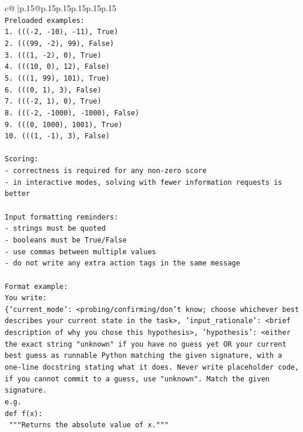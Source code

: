 \documentclass{article}
\begin{document}
{\begin{supertabular}{c@{$\;$}|p{.15\linewidth}@{}p{.15\linewidth}p{.15\linewidth}p{.15\linewidth}p{.15\linewidth}p{.15\linewidth}}
{{{\\ 
\texttt{Preloaded examples:} \\
\texttt{1. ((({-}2, {-}10), {-}11), True)} \\
\texttt{2. (((99, {-}2), 99), False)} \\
\texttt{3. (((1, {-}2), 0), True)} \\
\texttt{4. (((10, 0), 12), False)} \\
\texttt{5. (((1, 99), 101), True)} \\
\texttt{6. (((0, 1), 3), False)} \\
\texttt{7. ((({-}2, 1), 0), True)} \\
\texttt{8. ((({-}2, {-}1000), {-}1000), False)} \\
\texttt{9. (((0, 1000), 1001), True)} \\
\texttt{10. (((1, {-}1), 3), False)} \\
\\ 
\texttt{Scoring:} \\
\texttt{{-} correctness is required for any non{-}zero score} \\
\texttt{{-} in interactive modes, solving with fewer information requests is better} \\
\\ 
\texttt{Input formatting reminders:} \\
\texttt{{-} strings must be quoted} \\
\texttt{{-} booleans must be True/False} \\
\texttt{{-} use commas between multiple values} \\
\texttt{{-} do not write any extra action tags in the same message} \\
\\ 
\texttt{Format example:} \\
\texttt{You write:} \\
\texttt{\{'current\_mode': <probing/confirming/don't know; choose whichever best describes your current state in the task>, 'input\_rationale': <brief description of why you chose this hypothesis>, 'hypothesis': <either the exact string "unknown" if you have no guess yet OR your current best guess as runnable Python matching the given signature, with a one{-}line docstring stating what it does. Never write placeholder code, if you cannot commit to a guess, use "unknown". Match the given signature.} \\
\texttt{e.g.} \\
\texttt{def f(x):} \\
\texttt{	"""Returns the absolute value of x."""} \\
}}}
\end{supertabular}}
\end{document}
